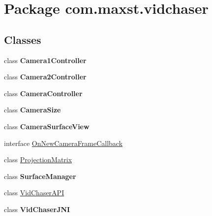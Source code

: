 \hypertarget{namespacecom_1_1maxst_1_1vidchaser}{}\section{Package com.\+maxst.\+vidchaser}
\label{namespacecom_1_1maxst_1_1vidchaser}
\subsection*{Classes}
\begin{DoxyCompactItemize}
\item 
class {\bfseries Camera1\+Controller}
\item 
class {\bfseries Camera2\+Controller}
\item 
class {\bfseries Camera\+Controller}
\item 
class {\bfseries Camera\+Size}
\item 
class {\bfseries Camera\+Surface\+View}
\item 
interface \hyperlink{interfacecom_1_1maxst_1_1vidchaser_1_1_on_new_camera_frame_callback}{On\+New\+Camera\+Frame\+Callback}
\item 
class \hyperlink{classcom_1_1maxst_1_1vidchaser_1_1_projection_matrix}{Projection\+Matrix}
\item 
class {\bfseries Surface\+Manager}
\item 
class \hyperlink{classcom_1_1maxst_1_1vidchaser_1_1_vid_chaser_a_p_i}{Vid\+Chaser\+A\+PI}
\item 
class {\bfseries Vid\+Chaser\+J\+NI}
\end{DoxyCompactItemize}
